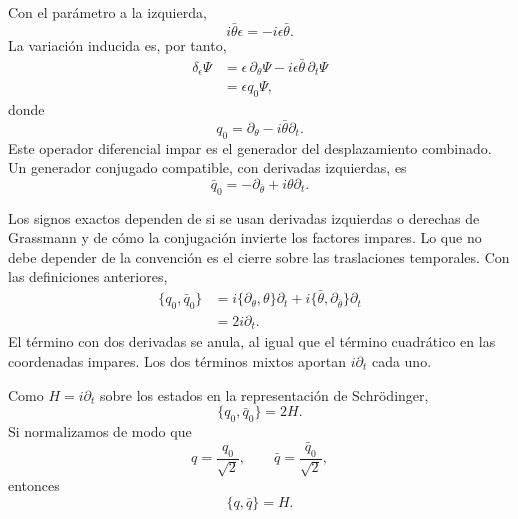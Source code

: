 Con el parámetro a la izquierda,
\begin{equation}
i\bar\theta\epsilon=-i\epsilon\bar\theta.
\end{equation}
La variación inducida es, por tanto,
\begin{align}
\delta_\epsilon\Psi
&=\epsilon\,\partial_\theta\Psi
-i\epsilon\bar\theta\,\partial_t\Psi\\
&=\epsilon q_0\Psi,
\end{align}
donde
\begin{equation}
q_0=\partial_\theta-i\bar\theta\partial_t.
\end{equation}
Este operador diferencial impar es el generador del desplazamiento combinado. Un generador conjugado compatible, con derivadas izquierdas, es
\begin{equation}
\bar q_0=-\partial_{\bar\theta}
+i\theta\partial_t.
\end{equation}

Los signos exactos dependen de si se usan derivadas izquierdas o derechas de Grassmann y de cómo la conjugación invierte los factores impares. Lo que no debe depender de la convención es el cierre sobre las traslaciones temporales. Con las definiciones anteriores,
\begin{align}
\{q_0,\bar q_0\}
&=i\{\partial_\theta,\theta\}\partial_t
+i\{\bar\theta,\partial_{\bar\theta}\}\partial_t\\
&=2i\partial_t.
\end{align}
El término con dos derivadas se anula, al igual que el término cuadrático en las coordenadas impares. Los dos términos mixtos aportan \(i\partial_t\) cada uno.

Como \(H=i\partial_t\) sobre los estados en la representación de Schrödinger,
\begin{equation}
\{q_0,\bar q_0\}=2H.
\end{equation}
Si normalizamos de modo que
\begin{equation}
q=\frac{q_0}{\sqrt2},
\qquad
\bar q=\frac{\bar q_0}{\sqrt2},
\end{equation}
entonces
\begin{equation}
\boxed{\{q,\bar q\}=H.}
\end{equation}

